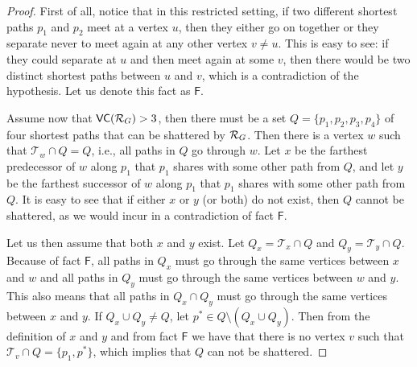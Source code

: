 \ifproof
\begin{proof}
  First of all, notice that in this restricted setting, if two different
  shortest paths $p_1$ and $p_2$ meet at a vertex $u$, then they either go on
  together or %
  they separate never to meet again at any other
  vertex $v\neq u$. This is easy to see: if they could separate at $u$ and then
  meet again at some $v$, then there would be two distinct shortest paths
  between $u$ and $v$, which is a contradiction of the hypothesis. Let us denote
  this fact as $\mathsf{F}$.

  Assume now that $\mathsf{VC}(\mathcal{R}_G)>3$, then there must be a set
  $Q=\{p_1,p_2,p_3,p_4\}$ of four shortest paths that can be shattered by
  $\mathcal{R}_G$. Then there is a vertex $w$ such that $\mathcal{T}_w\cap Q=Q$, i.e.,
  all paths in $Q$ go through $w$. Let $x$ be the farthest predecessor of $w$
  along $p_1$ that $p_1$ shares with some other path from $Q$, and let $y$ be
  the farthest successor of $w$ along $p_1$ that $p_1$ shares with some other
  path from $Q$. It is easy to see that if either $x$ or $y$ (or both) do not
  exist, then $Q$ cannot be shattered, as we would incur in a contradiction of
  fact $\mathsf{F}$. 
  
  Let us then assume that both $x$ and $y$ exist.
  Let $Q_x=\mathcal{T}_x\cap Q$ and $Q_y=\mathcal{T}_y\cap Q$.
  Because of fact $\mathsf{F}$, all paths in $Q_x$ must go through the same vertices
  between $x$ and $w$ and all paths in $Q_y$ must go through the same vertices
  between $w$ and $y$. This also means that all paths in $Q_x\cap Q_y$ must go
  through the same vertices between $x$ and $y$. If $Q_x\cup Q_y\neq Q$, let
  $p^*\in Q\setminus(Q_x\cup Q_y)$. Then from the definition of $x$ and $y$ and
  from fact $\mathsf{F}$ we have that there is no vertex $v$ such that
  $\mathcal{T}_v\cap Q=\{p_1,p^*\}$, which implies that $Q$ can not be
  shattered. 
  

\end{proof}
